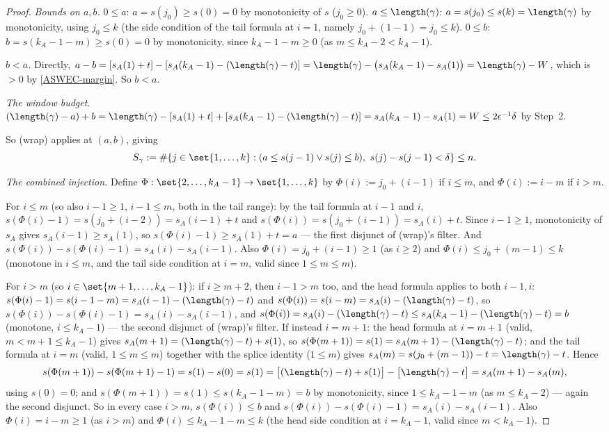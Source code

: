\begin{proof}
  \emph{Bounds on $a,b$.} $0\le a$: $a=s(j_0)\ge s(0)=0$ by monotonicity of $s$ ($j_0\ge0$).
  $a\le\length(\gamma)$: $a=s(j_0)\le s(k)=\length(\gamma)$ by monotonicity, using $j_0\le k$ (the
  side condition of the tail formula at $i=1$, namely $j_0+(1-1)=j_0\le k$). $0\le b$:
  $b=s(k_A-1-m)\ge s(0)=0$ by monotonicity, since $k_A-1-m\ge0$ (as $m\le k_A-2<k_A-1$).

  \emph{$b<a$.} Directly, $a-b = [s_A(1)+t]-[s_A(k_A-1)-(\length(\gamma)-t)] =
  \length(\gamma)-\bigl(s_A(k_A-1)-s_A(1)\bigr) = \length(\gamma)-W$, which is $>0$ by
  \eqref{ASWEC-margin}. So $b<a$.

  \emph{The window budget.} $(\length(\gamma)-a)+b = \length(\gamma)-[s_A(1)+t] +
  [s_A(k_A-1)-(\length(\gamma)-t)] = s_A(k_A-1)-s_A(1) = W \le 2\epsilon^{-1}\delta$ by Step~2.

  So (wrap) applies at $(a,b)$, giving
  \[
    S_\gamma := \#\{j\in\set{1,\dots,k} : (a\le s(j-1)\vee s(j)\le b),\ s(j)-s(j-1)<\delta\} \le n
    .
  \]

  \emph{The combined injection.} Define $\Phi:\set{2,\dots,k_A-1}\to\set{1,\dots,k}$ by
  $\Phi(i):=j_0+(i-1)$ if $i\le m$, and $\Phi(i):=i-m$ if $i>m$.

  For $i\le m$ (so also $i-1\ge1$, $i-1\le m$, both in the tail range): by the tail formula at
  $i-1$ and $i$, $s(\Phi(i)-1)=s(j_0+(i-2))=s_A(i-1)+t$ and $s(\Phi(i))=s(j_0+(i-1))=s_A(i)+t$.
  Since $i-1\ge1$, monotonicity of $s_A$ gives $s_A(i-1)\ge s_A(1)$, so
  $s(\Phi(i)-1)\ge s_A(1)+t=a$ — the first disjunct of (wrap)'s filter. And
  $s(\Phi(i))-s(\Phi(i)-1)=s_A(i)-s_A(i-1)$. Also $\Phi(i)=j_0+(i-1)\ge1$ (as $i\ge2$) and
  $\Phi(i)\le j_0+(m-1)\le k$ (monotone in $i\le m$, and the tail side condition at $i=m$, valid
  since $1\le m\le m$).

  For $i>m$ (so $i\in\set{m+1,\dots,k_A-1}$): if $i\ge m+2$, then $i-1>m$ too, and the head
  formula applies to both $i-1,i$: $s(\Phi(i)-1)=s(i-1-m)=s_A(i-1)-(\length(\gamma)-t)$ and
  $s(\Phi(i))=s(i-m)=s_A(i)-(\length(\gamma)-t)$, so $s(\Phi(i))-s(\Phi(i)-1)=s_A(i)-s_A(i-1)$,
  and $s(\Phi(i))=s_A(i)-(\length(\gamma)-t)\le s_A(k_A-1)-(\length(\gamma)-t)=b$ (monotone,
  $i\le k_A-1$) — the second disjunct of (wrap)'s filter. If instead $i=m+1$: the head formula at
  $i=m+1$ (valid, $m<m+1\le k_A-1$) gives $s_A(m+1)=(\length(\gamma)-t)+s(1)$, so
  $s(\Phi(m+1))=s(1)=s_A(m+1)-(\length(\gamma)-t)$; and the tail formula at $i=m$ (valid, $1\le
  m\le m$) together with the splice identity ($1\le m$) gives
  $s_A(m)=s(j_0+(m-1))-t=\length(\gamma)-t$. Hence
  \[
    s(\Phi(m+1))-s(\Phi(m+1)-1) = s(1)-s(0) = s(1) =
    \bigl[(\length(\gamma)-t)+s(1)\bigr]-\bigl[\length(\gamma)-t\bigr] = s_A(m+1)-s_A(m)
    ,
  \]
  using $s(0)=0$; and $s(\Phi(m+1))=s(1)\le s(k_A-1-m)=b$ by monotonicity, since $1\le k_A-1-m$
  (as $m\le k_A-2$) — again the second disjunct. So in every case $i>m$, $s(\Phi(i))\le b$ and
  $s(\Phi(i))-s(\Phi(i)-1)=s_A(i)-s_A(i-1)$. Also $\Phi(i)=i-m\ge1$ (as $i>m$) and
  $\Phi(i)\le k_A-1-m\le k$ (the head side condition at $i=k_A-1$, valid since $m<k_A-1$).


\end{proof}
